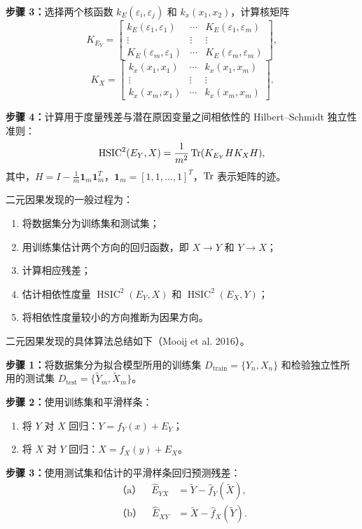 \noindent\textbf{步骤 3：}选择两个核函数 $k_E(\varepsilon_i,\varepsilon_j)$ 和 $k_x(x_1,x_2)$，计算核矩阵
\[
K_{E_Y}=
\begin{bmatrix}
k_E(\varepsilon_1,\varepsilon_1)&\cdots&K_E(\varepsilon_1,\varepsilon_m)\\
\vdots&\vdots&\vdots\\
K_E(\varepsilon_m,\varepsilon_1)&\cdots&K_E(\varepsilon_m,\varepsilon_m)
\end{bmatrix},
\]
\[
K_X=
\begin{bmatrix}
k_x(x_1,x_1)&\cdots&k_x(x_1,x_m)\\
\vdots&\vdots&\vdots\\
k_x(x_m,x_1)&\cdots&k_x(x_m,x_m)
\end{bmatrix}.
\]

\noindent\textbf{步骤 4：}计算用于度量残差与潜在原因变量之间相依性的 Hilbert--Schmidt 独立性准则：
\[
\operatorname{HSIC}^{2}(E_Y,X)=\frac1{m^2}\operatorname{Tr}(K_{E_Y}HK_XH),
\]
其中，$H=I-\frac1m\mathbf1_m\mathbf1_m^T$，$\mathbf1_m=[1,1,\ldots,1]^T$，$\operatorname{Tr}$ 表示矩阵的迹。

二元因果发现的一般过程为：
\begin{enumerate}
\item 将数据集分为训练集和测试集；
\item 用训练集估计两个方向的回归函数，即 $X\to Y$ 和 $Y\to X$；
\item 计算相应残差；
\item 估计相依性度量 $\operatorname{HSIC}^2(E_Y,X)$ 和 $\operatorname{HSIC}^2(E_X,Y)$；
\item 将相依性度量较小的方向推断为因果方向。
\end{enumerate}
二元因果发现的具体算法总结如下（Mooij et al. 2016）。

\noindent\textbf{步骤 1：}将数据集分为拟合模型所用的训练集 $D_{\mathrm{train}}=\{Y_n,X_n\}$ 和检验独立性所用的测试集 $D_{\mathrm{test}}=\{\widetilde Y_m,\widetilde X_m\}$。

\noindent\textbf{步骤 2：}使用训练集和平滑样条：
\begin{enumerate}[label=(\alph*)]
\item 将 $Y$ 对 $X$ 回归：$Y=f_Y(x)+E_Y$；
\item 将 $X$ 对 $Y$ 回归：$X=f_X(y)+E_X$。
\end{enumerate}

\noindent\textbf{步骤 3：}使用测试集和估计的平滑样条回归预测残差：
\[
\begin{aligned}
\text{（a）}\quad\widehat E_{YX}&=\widetilde Y-\widehat f_Y(\widetilde X),\\
\text{（b）}\quad\widehat E_{XY}&=\widetilde X-\widehat f_X(\widetilde Y).
\end{aligned}
\]

